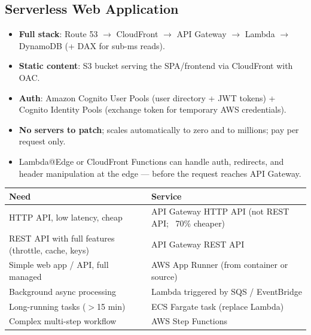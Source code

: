 \subsection{Serverless Web Application}

\begin{keyfacts}
\begin{itemize}
  \item \textbf{Full stack}: Route 53 $\to$ CloudFront $\to$ API Gateway $\to$ Lambda $\to$
        DynamoDB (+ DAX for sub-ms reads).
  \item \textbf{Static content}: S3 bucket serving the SPA/frontend via CloudFront with OAC.
  \item \textbf{Auth}: Amazon Cognito User Pools (user directory + JWT tokens) + Cognito
        Identity Pools (exchange token for temporary AWS credentials).
  \item \textbf{No servers to patch}; scales automatically to zero and to millions; pay per
        request only.
  \item Lambda@Edge or CloudFront Functions can handle auth, redirects, and header
        manipulation at the edge — before the request reaches API Gateway.
\end{itemize}
\end{keyfacts}

\begin{comparebox}[title={Serverless web app --- service substitutions}]
\begin{tabular}{@{}p{4.5cm}p{7cm}@{}}
\toprule
\textbf{Need} & \textbf{Service} \\
\midrule
HTTP API, low latency, cheap          & API Gateway HTTP API (not REST API; ~70\% cheaper) \\
REST API with full features (throttle, cache, keys) & API Gateway REST API \\
Simple web app / API, full managed    & AWS App Runner (from container or source) \\
Background async processing           & Lambda triggered by SQS / EventBridge \\
Long-running tasks ($>$15 min)        & ECS Fargate task (replace Lambda) \\
Complex multi-step workflow           & AWS Step Functions \\
\bottomrule
\end{tabular}
\end{comparebox}

